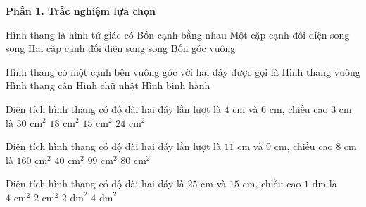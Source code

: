 \textbf{Phần 1. Trắc nghiệm lựa chọn}

\begin{ex} %
Hình thang là hình tứ giác có
\choice
{Bốn cạnh bằng nhau}
{\True Một cặp cạnh đối diện song song}
{Hai cặp cạnh đối diện song song}
{Bốn góc vuông}
\end{ex}

\begin{ex} %
Hình thang có một cạnh bên vuông góc với hai đáy được gọi là
\choice
{\True Hình thang vuông}
{Hình thang cân}
{Hình chữ nhật}
{Hình bình hành}
\end{ex}

\begin{ex} %
Diện tích hình thang có độ dài hai đáy lần lượt là $4\text{ cm}$ và $6\text{ cm}$, chiều cao $3\text{ cm}$ là
\choice
{$30\text{ cm}^2$}
{$18\text{ cm}^2$}
{\True $15\text{ cm}^2$}
{$24\text{ cm}^2$}
\end{ex}

\begin{ex} %
Diện tích hình thang có độ dài hai đáy lần lượt là $11\text{ cm}$ và $9\text{ cm}$, chiều cao $8\text{ cm}$ là
\choice
{$160\text{ cm}^2$}
{$40\text{ cm}^2$}
{$99\text{ cm}^2$}
{\True $80\text{ cm}^2$}
\end{ex}

\begin{ex} %
Diện tích hình thang có độ dài hai đáy là $25\text{ cm}$ và $15\text{ cm}$, chiều cao $1\text{ dm}$ là
\choice
{$4\text{ cm}^2$}
{$2\text{ cm}^2$}
{\True $2\text{ dm}^2$}
{$4\text{ dm}^2$}
\end{ex}

